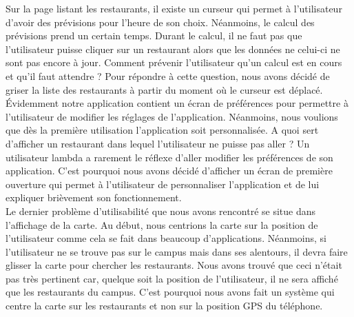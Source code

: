  
Sur la page listant les restaurants, il existe un curseur qui permet à l'utilisateur
d'avoir des prévisions pour l'heure de son choix. Néanmoins, le calcul des
prévisions prend un certain temps. Durant le calcul, il ne faut pas que l'utilisateur 
puisse cliquer sur un restaurant alors que les données ne celui-ci ne sont pas
encore à jour. Comment prévenir l'utilisateur qu'un calcul est en cours et qu'il 
faut attendre ? Pour répondre à cette question, nous avons décidé de griser la 
liste des restaurants à partir du moment où le curseur est déplacé. \\

Évidemment notre application contient un écran de préférences pour permettre
à l'utilisateur de modifier les réglages de l'application. Néanmoins, nous 
voulions que dès la première utilisation l'application soit personnalisée. A 
quoi sert d'afficher un restaurant dans lequel l'utilisateur ne puisse pas aller ?
Un utilisateur lambda a rarement le réflexe d'aller modifier les préférences de
son application. C'est pourquoi nous avons décidé d'afficher un écran de première
ouverture qui permet à l'utilisateur de personnaliser l'application et de lui
expliquer brièvement son fonctionnement. \\

Le dernier problème d'utilisabilité que nous avons rencontré se situe
dans l'affichage de la carte. Au début, nous centrions la carte sur la 
position de l'utilisateur comme cela se fait dans beaucoup d'applications. 
Néanmoins, si l'utilisateur ne se trouve pas sur le campus mais dans ses
alentours, il devra faire glisser la carte pour chercher les restaurants. 
Nous avons trouvé que ceci n'était pas très pertinent car, quelque soit la
position de l'utilisateur, il ne sera affiché que les restaurants du campus. 
C'est pourquoi nous avons fait un système qui centre la carte sur les restaurants
et non sur la position GPS du téléphone. 
  
